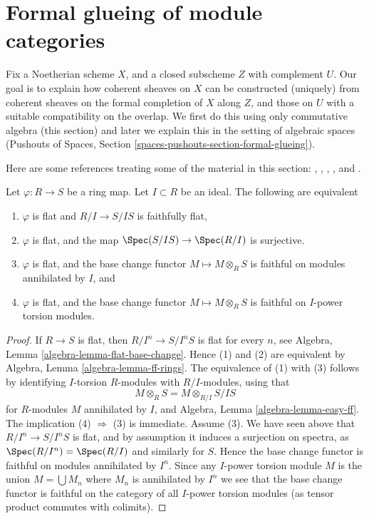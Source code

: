 \section{Formal glueing of module categories}
\label{section-formal-glueing}

\noindent
Fix a Noetherian scheme $X$, and a closed subscheme $Z$ with complement $U$.
Our goal is to explain how coherent sheaves on $X$ can be constructed
(uniquely) from coherent sheaves on the formal completion of $X$ along
$Z$, and those on $U$ with a suitable compatibility on the overlap.
We first do this using only commutative algebra (this section) and
later we explain this in the setting of algebraic spaces
(Pushouts of Spaces, Section \ref{spaces-pushouts-section-formal-glueing}).

\medskip\noindent
Here are some references treating some of the material in this section:
\cite[Section 2]{ArtinII},
\cite[Appendix]{Ferrand-Raynaud},
\cite{Beauville-Laszlo},
\cite{MB}, and
\cite[Section 4.6]{dJ-crystalline}.

\begin{lemma}
\label{lemma-characterize-flatness-on-torsion}
Let $\varphi : R \to S$ be a ring map. Let $I \subset R$ be an ideal.
The following are equivalent
\begin{enumerate}
\item $\varphi$ is flat and $R/I \to S/IS$ is faithfully flat,
\item $\varphi$ is flat, and the map
$\Spec(S/IS) \to \Spec(R/I)$ is surjective.
\item $\varphi$ is flat, and the base change functor
$M \mapsto M \otimes_R S$ is faithful on modules annihilated by $I$, and
\item $\varphi$ is flat, and the base change functor
$M \mapsto M \otimes_R S$ is faithful on $I$-power torsion modules.
\end{enumerate}
\end{lemma}

\begin{proof}
If $R \to S$ is flat, then $R/I^n \to S/I^nS$ is flat for every $n$, see
Algebra, Lemma \ref{algebra-lemma-flat-base-change}.
Hence (1) and (2) are equivalent by
Algebra, Lemma \ref{algebra-lemma-ff-rings}.
The equivalence of (1) with (3) follows by identifying $I$-torsion
$R$-modules with $R/I$-modules, using that
$$
M \otimes_R S = M \otimes_{R/I} S/IS
$$
for $R$-modules $M$ annihilated by $I$, and
Algebra, Lemma \ref{algebra-lemma-easy-ff}.
The implication (4) $\Rightarrow$ (3) is immediate. Assume (3). We have
seen above that $R/I^n \to S/I^nS$ is flat, and by assumption it induces
a surjection on spectra, as $\Spec(R/I^n) = \Spec(R/I)$ and
similarly for $S$. Hence the base change functor is faithful on modules
annihilated by $I^n$. Since any $I$-power torsion module $M$ is the union
$M = \bigcup M_n$ where $M_n$ is annihilated by $I^n$ we see that the base
change functor is faithful on the category of all $I$-power torsion modules
(as tensor product commutes with colimits).
\end{proof}

